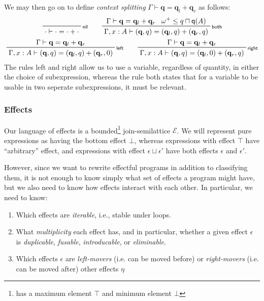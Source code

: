 \documentclass[acmsmall,screen,review]{acmart}
\newcommand{\mc}[1]{\ensuremath{\mathcal{#1}}}
\newcommand{\mb}[1]{\ensuremath{\mathbf{#1}}}
\newcommand{\ms}[1]{\ensuremath{\mathsf{#1}}}
\newcommand{\qsp}[4]{#1 \vdash #2 = #3 + #4}
\newcommand{\rle}[1]{{\scriptsize\textsf{#1}}}
\newcommand{\brle}[1]{{\textsf{#1}}}
\newcommand{\zeroq}{0}
\newcommand{\cpyq}{\omega^+}
\newcommand{\alquant}{\ms{q}}
\begin{document}
We may then go on to define \emph{context splitting} $\qsp{\Gamma}{\mb{q}}{\mb{q}_l}{\mb{q}_r}$ as
follows:
\begin{gather*}
  \prftree[r]{\rle{nil}}
    {\qsp{\cdot}{\cdot}{\cdot}{\cdot}} \qquad
  \prftree[r]{\rle{both}}
    {\qsp{\Gamma}{\mb{q}}{\mb{q}_l}{\mb{q}_r}}
    {\cpyq \leq q \sqcap \alquant(A)}
    {\qsp{\Gamma, x : A}{(\mb{q}, q)}{(\mb{q}_l, q)}{(\mb{q}_r, q)}}
    \\
  \prftree[r]{\rle{left}}
    {\qsp{\Gamma}{\mb{q}}{\mb{q}_l}{\mb{q}_r}}
    {\qsp{\Gamma, x : A}{(\mb{q}, q)}{(\mb{q}_l, q)}{(\mb{q}_r, \zeroq)}} \qquad
  \prftree[r]{\rle{right}}
    {\qsp{\Gamma}{\mb{q}}{\mb{q}_l}{\mb{q}_r}}
    {\qsp{\Gamma, x : A}{(\mb{q}, q)}{(\mb{q}_l, \zeroq)}{(\mb{q}_r, q)}}
\end{gather*}
The rules \brle{left} and \brle{right} allow us to use a variable, regardless of quantity, in either
the choice of subexpression, whereas the rule \brle{both} states that for a variable to be usable in
two seperate subexpressions, it must be relevant.

\subsubsection{Effects}
Our language of effects is a bounded\footnote{has a maximum element $\top$ and minimum element $\bot$} join-semilattice $\mc{E}$. We will represent pure expressions
as having the bottom effect $\bot$, whereas expressions with effect $\top$ have ``arbitrary''
effect, and expressions with effect $\epsilon \sqcup \epsilon'$
have both effects $\epsilon$ and $\epsilon'$.

However, since we want to rewrite effectful programs in addition to classifying them, it is not enough to know simply what set of effects a program might have, but we also need to know how effects interact with each
other. In particular, we need to know:
\begin{enumerate}
  \item Which effects are \emph{iterable}, i.e., stable under loops. %
  \item What \emph{multiplicity} each effect has, and in particular, whether a given effect
  $\epsilon$ is \emph{duplicable}, \emph{fusable}, \emph{introducable}, or \emph{eliminable}.
  \item Which effects $\epsilon$ are \emph{left-movers} (i.e. can be moved before) or
  \emph{right-movers} (i.e. can be moved after) other effects $\eta$
\end{enumerate}
\end{document}
